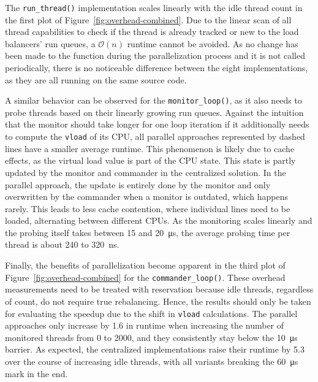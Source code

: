 The \texttt{run\_thread()} implementation scales linearly with the idle thread count in the first plot of Figure~\ref{fig:overhead-combined}.
Due to the linear scan of all thread capabilities to check if the thread is already tracked or new to the load balancers' run queues, a $\mathcal{O}(n)$ runtime cannot be avoided.
As no change has been made to the function during the parallelization process and it is not called periodically, there is no noticeable difference between the eight implementations, as they are all running on the same source code.

A similar behavior can be observed for the \texttt{monitor\_loop()}, as it also needs to probe threads based on their linearly growing run queues.
Against the intuition that the monitor should take longer for one loop iteration if it additionally needs to compute the \texttt{vload} of its CPU, all parallel approaches represented by dashed lines have a smaller average runtime.
This phenomenon is likely due to cache effects, as the virtual load value is part of the CPU state.
This state is partly updated by the monitor and commander in the centralized solution.
In the parallel approach, the update is entirely done by the monitor and only overwritten by the commander when a monitor is outdated, which happens rarely.
This leads to less cache contention, where individual lines need to be loaded, alternating between different CPUs.
As the monitoring scales linearly and the probing itself takes between 15 and \SI{20}{\micro\second}, the average probing time per thread is about 240 to \SI{320}{\ns}.

Finally, the benefits of parallelization become apparent in the third plot of Figure~\ref{fig:overhead-combined} for the \texttt{commander\_loop()}.
These overhead measurements need to be treated with reservation because idle threads, regardless of count, do not require true rebalancing.
Hence, the results should only be taken for evaluating the speedup due to the shift in \texttt{vload} calculations.
The parallel approaches only increase by 1.6 in runtime when increasing the number of monitored threads from 0 to 2000, and they consistently stay below the \SI{10}{\micro\second} barrier.
As expected, the centralized implementations raise their runtime by 5.3 over the course of increasing idle threads, with all variants breaking the \SI{60}{\micro\second} mark in the end.

